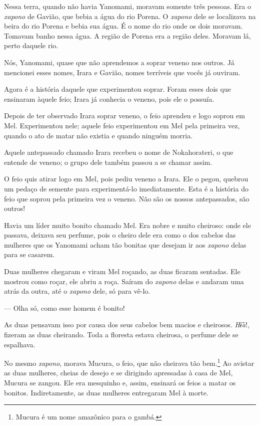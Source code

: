 Nessa terra, quando não havia Yanomami, moravam somente três pessoas.
Era o \textit{xapono} de Gavião, que bebia a água do rio Porena. O \textit{xapono} dele se
localizava na beira do rio Porena e bebia sua água. É o nome do rio onde
os dois moravam. Tomavam banho nessa água. A região de Porena era a região
deles. Moravam lá, perto daquele rio.

Nós, Yanomami, quase que não aprendemos a soprar veneno nos outros. Já
mencionei esses nomes, Irara e Gavião, nomes terríveis que vocês já
ouviram. 

Agora é a história daquele que experimentou soprar. Foram esses dois que
ensinaram àquele feio; Irara já conhecia o veneno, pois ele o possuía. 

Depois de ter observado Irara soprar veneno, o feio aprendeu e logo
soprou em Mel. Experimentou nele; aquele feio experimentou em Mel pela
primeira vez, quando o ato de matar não existia e quando ninguém
morria. 

Aquele antepassado chamado Irara recebeu o nome de Nokahorateri, o que
entende de veneno; o grupo dele também passou a se chamar assim. 

O feio quis atirar logo em Mel, pois pediu veneno a Irara. Ele o pegou,
quebrou um pedaço de semente para experimentá-lo imediatamente. Esta é a
história do feio que soprou pela primeira vez o veneno. Não são os
nossos antepassados, são outros! 

Havia um líder muito bonito chamado Mel. Era nobre e muito cheiroso:
onde ele passava, deixava seu perfume, pois o cheiro dele era como o dos
cabelos das mulheres que os Yanomami acham tão bonitas que desejam
ir aos \textit{xapono} delas para se casarem.

Duas mulheres chegaram e viram Mel roçando, as duas ficaram sentadas. Ele
mostrou como roçar, ele abriu a roça. Saíram do \textit{xapono} delas e andaram uma
atrás da outra, até o \textit{xapono} dele, só para vê-lo. 

--- Olha só, como esse homem é bonito! 

As duas pensavam isso por causa dos seus cabelos bem macios e
cheirosos. \textit{Hɨ̃a}!, fizeram as duas cheirando. Toda a floresta
estava cheirosa, o perfume dele se espalhava. 

No mesmo \textit{xapono}, morava Mucura, o feio, que não cheirava tão bem.\footnote{Mucura é um nome amazônico para o gambá.} Ao avistar as duas mulheres, cheias de desejo e se
dirigindo apressadas à casa de Mel, Mucura se zangou. Ele era mesquinho
e, assim, ensinará os feios a matar os bonitos. Indiretamente, as
duas mulheres entregaram Mel à morte. 

